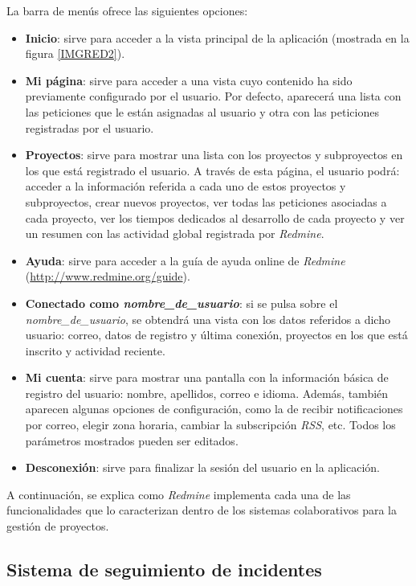 \documentclass[11pt,a4paper,spanish,twoside]{report}
\begin{document}
La barra de menús ofrece las siguientes opciones:
\begin{itemize}
	\item \textbf{Inicio}: sirve para acceder a la vista principal de la
aplicación (mostrada en la figura \ref{IMGRED2}).
	\item \textbf{Mi página}: sirve para acceder a una vista cuyo contenido ha
sido previamente configurado por el usuario. Por defecto, aparecerá una lista
con las peticiones que le están asignadas al usuario y otra con las peticiones
registradas por el usuario.
	\item \textbf{Proyectos}: sirve para mostrar una lista con los proyectos y
subproyectos en los que está registrado el usuario. A través de esta página,
el usuario podrá: acceder a la información referida a cada uno de estos
proyectos y subproyectos, crear nuevos proyectos, ver todas las peticiones
asociadas a cada proyecto, ver los tiempos dedicados al desarrollo de cada
proyecto y ver un resumen con las actividad global registrada por
\emph{Redmine}.
	\item \textbf{Ayuda}: sirve para acceder a la guía de ayuda online de
\emph{Redmine} (\url{http://www.redmine.org/guide}).
	\item \textbf{Conectado como \emph{nombre\_de\_usuario}}: si se pulsa sobre
el \emph{nombre\_de\_usuario}, se obtendrá una vista con los datos referidos
a dicho usuario: correo, datos de registro y última conexión, proyectos en los
que está inscrito y actividad reciente.
	\item \textbf{Mi cuenta}: sirve para mostrar una pantalla con la información
básica de registro del usuario: nombre, apellidos, correo e idioma. Además,
también aparecen algunas opciones de configuración, como la de recibir
notificaciones por correo, elegir zona horaria, cambiar la subscripción
\emph{RSS}, etc. Todos los parámetros mostrados pueden ser editados.
	\item \textbf{Desconexión}: sirve para finalizar la sesión del usuario en la
aplicación.
\end{itemize}

A continuación, se explica como \emph{Redmine} implementa cada una de las
funcionalidades que lo caracterizan dentro de los sistemas colaborativos para
la gestión de proyectos.

	\subsection{Sistema de seguimiento de incidentes}
        
\end{document}
